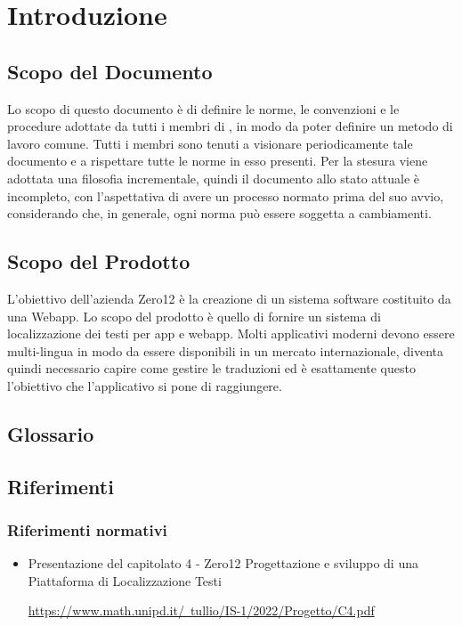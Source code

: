 \section{Introduzione}
\subsection{Scopo del Documento}
Lo scopo di questo documento è di definire le norme, le convenzioni e le procedure adottate da tutti i membri di \groupName{}, in modo da poter definire un metodo di lavoro comune. Tutti i membri sono tenuti a visionare periodicamente tale documento e a rispettare tutte le norme in esso presenti. Per la stesura viene adottata una filosofia incrementale, quindi il documento allo stato attuale è incompleto, con l'aspettativa di avere un processo normato prima del suo avvio, considerando che, in generale, ogni norma può essere soggetta a cambiamenti.

\subsection{Scopo del Prodotto}
L'obiettivo dell'azienda Zero12\glo{} è la creazione di un sistema software costituito da una Webapp. Lo scopo del prodotto è quello di fornire un sistema di localizzazione dei testi per app e webapp. Molti applicativi moderni devono essere multi-lingua in modo da essere disponibili in un mercato internazionale, diventa quindi necessario capire come gestire le traduzioni ed è esattamente questo l’obiettivo che l’applicativo si pone di raggiungere.

\subsection{Glossario}
\gloDesc{}

\subsection{Riferimenti}
\subsubsection{Riferimenti normativi}
\begin{itemize}
\item Presentazione del capitolato\glo{} 4 - Zero12 Progettazione e sviluppo di una Piattaforma di Localizzazione Testi 

\href{https://www.math.unipd.it/~tullio/IS-1/2022/Progetto/C4.pdf}{https://www.math.unipd.it/~tullio/IS-1/2022/Progetto/C4.pdf}
\end{itemize}


